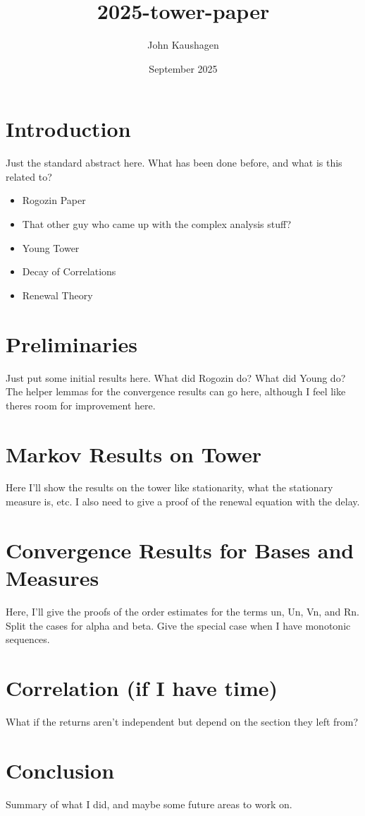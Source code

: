 \documentclass{article}
\title{2025-tower-paper}
\author{John Kaushagen}
\date{September 2025}
\begin{document}
\maketitle

\section{Introduction}
Just the standard abstract here.
What has been done before, and what is this related to?
\begin{itemize}
    \item Rogozin Paper
    \item That other guy who came up with the complex analysis stuff?
    \item Young Tower
    \item Decay of Correlations
    \item Renewal Theory
\end{itemize}

\section{Preliminaries}
Just put some initial results here.
What did Rogozin do?
What did Young do?
The helper lemmas for the convergence results can go here, although I feel like theres room for improvement here.

\section{Markov Results on Tower}
Here I'll show the results on the tower like stationarity, what the stationary measure is, etc.
I also need to give a proof of the renewal equation with the delay.

\section{Convergence Results for Bases and Measures}
Here, I'll give the proofs of the order estimates for the terms un, Un, Vn, and Rn.
Split the cases for alpha and beta.
Give the special case when I have monotonic sequences.

\section{Correlation (if I have time)}
What if the returns aren't independent but depend on the section they left from?

\section{Conclusion}
Summary of what I did, and maybe some future areas to work on.
\end{document}
